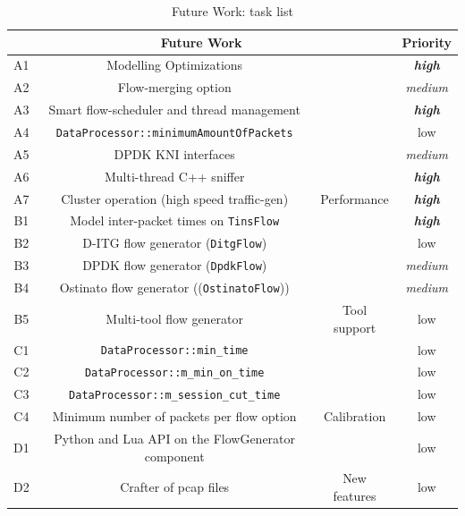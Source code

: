 \begin{table}[ht!]
    \centering
    \caption{Future Work: task list}
    \label{tab:task-list}
    \begin{tabular}{cccc}
        \hline
        \multicolumn{3}{c}{Future Work}    & Priority \\ \hline
        A1   & Modelling Optimizations                       &                                & \textbf{\textit{high}} \\
        A2   & Flow-merging option                                &                                & \textit{medium} \\
        A3   & Smart flow-scheduler and thread management &                                & \textbf{\textit{high}} \\
        A4   & \texttt{DataProcessor::minimumAmountOfPackets}     &                                & low \\
        A5   & DPDK KNI interfaces                                &                                & \textit{medium} \\
        A6   & Multi-thread C++ sniffer                           &                                & \textbf{\textit{high}} \\ 
        A7   & Cluster operation (high speed traffic-gen)         & \multirow{-7}{*}{Performance}  & \textbf{\textit{high}} \\ \hline
        B1   & Model inter-packet times on \texttt{TinsFlow}      &                                & \textbf{\textit{high}} \\
        B2   & D-ITG flow generator (\texttt{DitgFlow})           &                                & low \\
        B3  & DPDK flow generator (\texttt{DpdkFlow})            &                                & \textit{medium} \\
        B4  & Ostinato flow generator ((\texttt{OstinatoFlow}))            & 						&  \textit{medium}
         \\
        B5  &  Multi-tool flow generator    & \multirow{-5}{*}{Tool support} & low \\ \hline
        C1  & \texttt{DataProcessor::min\_time}                  &                                & low \\
        C2  & \texttt{DataProcessor::m\_min\_on\_time}           &                                & low \\
        C3  & \texttt{DataProcessor::m\_session\_cut\_time}      &                                & low \\
        C4  & Minimum number of packets per flow option          & \multirow{-4}{*}{Calibration}  & low \\ \hline
        D1  & Python and Lua API on the FlowGenerator component             &                                & low \\
        D2  & Crafter of  pcap files                             & \multirow{-2}{*}{New features} & low \\

        \hline
    \end{tabular}
\end{table}


